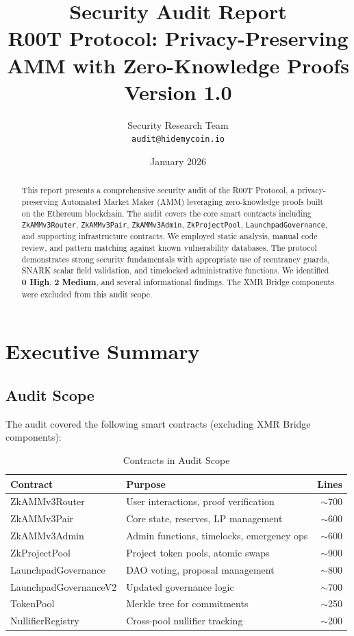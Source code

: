 \documentclass[12pt,a4paper]{article}
\title{
    \vspace{-1cm}
    \textbf{Security Audit Report}\\
    \Large R00T Protocol: Privacy-Preserving AMM with Zero-Knowledge Proofs\\
    \vspace{0.5cm}
    \large Version 1.0
}
\author{
    Security Research Team\\
    \texttt{audit@hidemycoin.io}
}
\date{January 2026}
\begin{document}
\maketitle

\begin{abstract}
This report presents a comprehensive security audit of the R00T Protocol, a privacy-preserving Automated Market Maker (AMM) leveraging zero-knowledge proofs built on the Ethereum blockchain. The audit covers the core smart contracts including \texttt{ZkAMMv3Router}, \texttt{ZkAMMv3Pair}, \texttt{ZkAMMv3Admin}, \texttt{ZkProjectPool}, \texttt{LaunchpadGovernance}, and supporting infrastructure contracts. We employed static analysis, manual code review, and pattern matching against known vulnerability databases. The protocol demonstrates strong security fundamentals with appropriate use of reentrancy guards, SNARK scalar field validation, and timelocked administrative functions. We identified \textbf{0 High}, \textbf{2 Medium}, and several informational findings. The XMR Bridge components were excluded from this audit scope.
\end{abstract}

\tableofcontents
\newpage

\section{Executive Summary}

\subsection{Audit Scope}

The audit covered the following smart contracts (excluding XMR Bridge components):

\begin{table}[h]
\centering
\begin{tabular}{llr}
\toprule
\textbf{Contract} & \textbf{Purpose} & \textbf{Lines} \\
\midrule
ZkAMMv3Router & User interactions, proof verification & $\sim$700 \\
ZkAMMv3Pair & Core state, reserves, LP management & $\sim$600 \\
ZkAMMv3Admin & Admin functions, timelocks, emergency ops & $\sim$600 \\
ZkProjectPool & Project token pools, atomic swaps & $\sim$900 \\
LaunchpadGovernance & DAO voting, proposal management & $\sim$800 \\
LaunchpadGovernanceV2 & Updated governance logic & $\sim$700 \\
TokenPool & Merkle tree for commitments & $\sim$250 \\
NullifierRegistry & Cross-pool nullifier tracking & $\sim$200 \\
\bottomrule
\end{tabular}
\caption{Contracts in Audit Scope}
\end{table}
\end{document}
